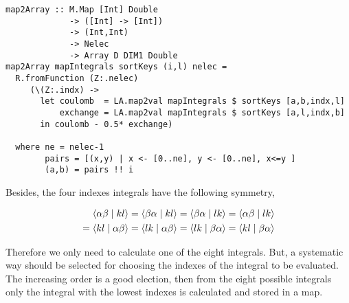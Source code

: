 \documentclass{tmr}
\begin{document}
\begin{lstlisting}[float,captionpos=b,belowcaptionskip=4pt, caption= The Map to Array Function]
map2Array :: M.Map [Int] Double 
             -> ([Int] -> [Int])
             -> (Int,Int) 
             -> Nelec 
             -> Array D DIM1 Double
map2Array mapIntegrals sortKeys (i,l) nelec = 
  R.fromFunction (Z:.nelec)
     (\(Z:.indx) ->
       let coulomb  = LA.map2val mapIntegrals $ sortKeys [a,b,indx,l]
           exchange = LA.map2val mapIntegrals $ sortKeys [a,l,indx,b]
       in coulomb - 0.5* exchange)
                                                            
  where ne = nelec-1
        pairs = [(x,y) | x <- [0..ne], y <- [0..ne], x<=y ]
        (a,b) = pairs !! i
\end{lstlisting}
 
Besides, the four indexes integrals have the following symmetry, 

\begin{equation} \label{27}
\begin{split}
\braket{\alpha \beta \mid kl} = \braket{ \beta \alpha \mid kl} 
= \braket{\beta \alpha \mid lk} = \braket{\alpha \beta \mid lk} \\
= \braket{kl\mid \alpha \beta} = \braket{lk \mid \alpha \beta} 
=\braket{lk \mid \beta \alpha} = \braket{kl\mid \beta \alpha}
\end{split}
\end{equation}

Therefore we only need to calculate one of the eight integrals. But, a systematic
way should be selected for choosing the indexes of the integral to be
evaluated. The increasing order is a good election, then from the eight possible integrals
only the integral with the lowest indexes is calculated and stored in a map. 
\end{document}
